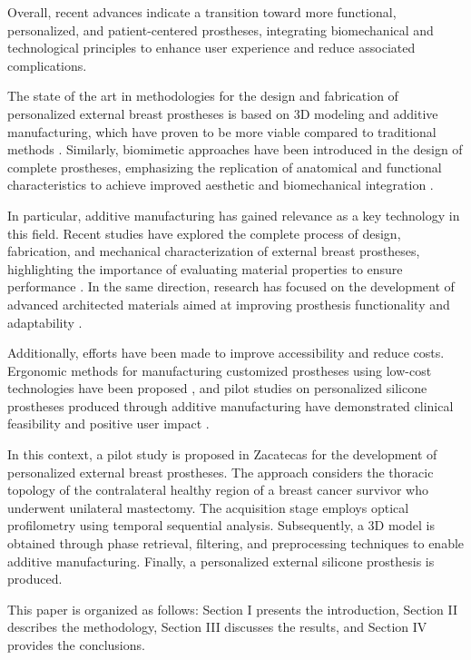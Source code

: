 \documentclass{article}
\begin{document}
Overall, recent advances indicate a transition toward more functional, personalized, and patient-centered prostheses, integrating biomechanical and technological principles to enhance user experience and reduce associated complications.

The state of the art in methodologies for the design and fabrication of personalized external breast prostheses is based on 3D modeling and additive manufacturing, which have proven to be more viable compared to traditional methods \cite{ASME2024,Montejo2020}. Similarly, biomimetic approaches have been introduced in the design of complete prostheses, emphasizing the replication of anatomical and functional characteristics to achieve improved aesthetic and biomechanical integration \cite{Cruz2018}. 

In particular, additive manufacturing has gained relevance as a key technology in this field. Recent studies have explored the complete process of design, fabrication, and mechanical characterization of external breast prostheses, highlighting the importance of evaluating material properties to ensure performance \cite{Cansing2024}. In the same direction, research has focused on the development of advanced architected materials aimed at improving prosthesis functionality and adaptability \cite{Zhang2025}. 

Additionally, efforts have been made to improve accessibility and reduce costs. Ergonomic methods for manufacturing customized prostheses using low-cost technologies have been proposed \cite{Regina2024}, and pilot studies on personalized silicone prostheses produced through additive manufacturing have demonstrated clinical feasibility and positive user impact \cite{Leme2023}. 

In this context, a pilot study is proposed in Zacatecas for the development of personalized external breast prostheses. The approach considers the thoracic topology of the contralateral healthy region of a breast cancer survivor who underwent unilateral mastectomy. The acquisition stage employs optical profilometry using temporal sequential analysis. Subsequently, a 3D model is obtained through phase retrieval, filtering, and preprocessing techniques to enable additive manufacturing. Finally, a personalized external silicone prosthesis is produced.

This paper is organized as follows: Section I presents the introduction, Section II describes the methodology, Section III discusses the results, and Section IV provides the conclusions.
\end{document}
